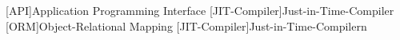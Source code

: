 [API]{Application Programming Interface}
[JIT-Compiler]{Just-in-Time-Compiler}
[ORM]{Object-Relational Mapping}
[JIT-Compiler]{Just-in-Time-Compilern}
